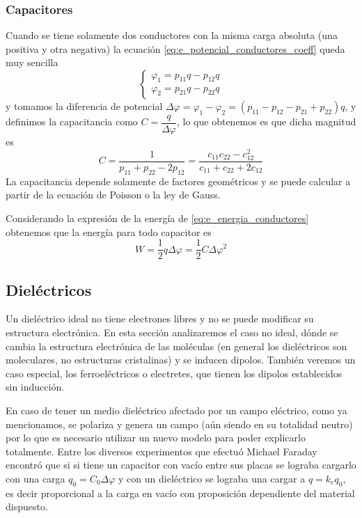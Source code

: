 \documentclass[11pt,a4paper]{article}
\numberwithin{equation}{section}
\begin{document}
\subsubsection{Capacitores}
Cuando se tiene solamente dos conductores con la misma carga absoluta (una positiva y otra negativa) la ecuación \ref{eq:e_potencial_conductores_coeff} queda muy sencilla
\begin{equation}
    \left\{ \begin{array}{l} \varphi_1 = p_{11} q - p_{12} q \\ \varphi_2 = p_{21} q - p_{22} q \end{array}\right.
\end{equation}
y tomamos la diferencia de potencial $\Delta \varphi = \varphi_1 - \varphi_2 = (p_{11} - p_{12} - p_{21} + p_{22})q$, y definimos la capacitancia como $C = \dfrac{q}{\Delta \varphi}$, lo que obtenemos es que dicha magnitud es
\begin{equation}
    C = \frac{1}{p_{11} + p_{22} - 2 p_{12}} = \frac{c_{11} c_{22} - c_{12}^2}{c_{11} + c_{22} + 2 c_{12}}
    \label{eq:e_capacitancia}
\end{equation}
La capacitancia depende solamente de factores geométricos y se puede calcular a partir de la ecuación de Poisson o la ley de Gauss. 

Considerando la expresión de la energía de \ref{eq:e_energia_conductores} obtenemos que la energía para todo capacitor es
\begin{equation}
    W = \frac{1}{2} q \Delta \varphi = \frac{1}{2} C \Delta \varphi^2                
    \label{eq:eng_capacitor}
\end{equation}

\subsection{Dieléctricos}
Un dieléctrico ideal no tiene electrones libres y no se puede modificar su estructura electrónica. En esta sección analizaremos el caso no ideal, dónde se cambia la estructura electrónica de las moléculas (en general los dieléctricos son moleculares, no estructuras cristalinas) y se inducen dipolos. También veremos un caso especial, los ferroeléctricos o electretes, que tienen los dipolos establecidos sin inducción.

En caso de tener un medio dieléctrico afectado por un campo eléctrico, como ya mencionamos, se polariza y genera un campo (aún siendo en su totalidad neutro) por lo que es necesario utilizar un nuevo modelo para poder explicarlo totalmente. Entre los diversos experimentos que efectuó Michael Faraday encontró que si si tiene un capacitor con vacío entre sus placas se lograba cargarlo con una carga $q_0 = C_0 \Delta \varphi$ y con un dieléctrico se lograba una cargar a $q = k_e q_0$, es decir proporcional a la carga en vacío con proposición dependiente del material dispuesto.
\end{document}
